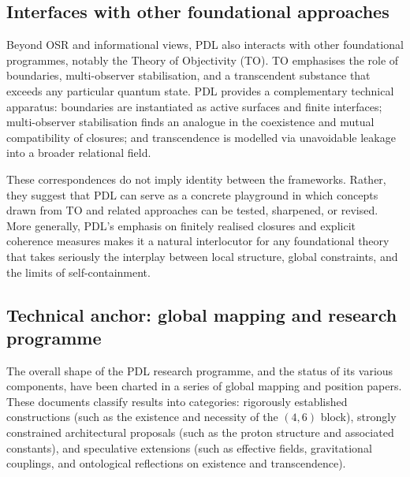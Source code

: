 \documentclass[11pt,a4paper]{article}
\theoremstyle{definition}
\begin{document}
\subsection{Interfaces with other foundational approaches}

Beyond OSR and informational views, PDL also interacts with other foundational programmes, notably the Theory of Objectivity (TO).\cite{Laubscher_PDL_TO_Dialogue_2024,Laubscher_PDL_Position_2024} TO emphasises the role of boundaries, multi-observer stabilisation, and a transcendent substance that exceeds any particular quantum state. PDL provides a complementary technical apparatus: boundaries are instantiated as active surfaces and finite interfaces; multi-observer stabilisation finds an analogue in the coexistence and mutual compatibility of closures; and transcendence is modelled via unavoidable leakage into a broader relational field.\cite{Laubscher_Leakage_Probability_2024,Laubscher_UniversalCoherenceLeakage_2024}

These correspondences do not imply identity between the frameworks. Rather, they suggest that PDL can serve as a concrete playground in which concepts drawn from TO and related approaches can be tested, sharpened, or revised.\cite{Laubscher_PDL_TO_Dialogue_2024} More generally, PDL’s emphasis on finitely realised closures and explicit coherence measures makes it a natural interlocutor for any foundational theory that takes seriously the interplay between local structure, global constraints, and the limits of self-containment.

\subsection{Technical anchor: global mapping and research programme}

The overall shape of the PDL research programme, and the status of its various components, have been charted in a series of global mapping and position papers.\cite{Laubscher_PDL_Position_2024,Laubscher_PDL_GlobalMapping_v6_2024} These documents classify results into categories: rigorously established constructions (such as the existence and necessity of the \((4,6)\) block), strongly constrained architectural proposals (such as the proton structure and associated constants), and speculative extensions (such as effective fields, gravitational couplings, and ontological reflections on existence and transcendence).\cite{Laubscher_MinimalClosures_46_2024,Laubscher_ProtonArch_v2_2024,Laubscher_Alpha_v2_2024,Laubscher_UniversalCoherenceLeakage_2024,Laubscher_Existence_PulsatingClosure_2026}
\end{document}
